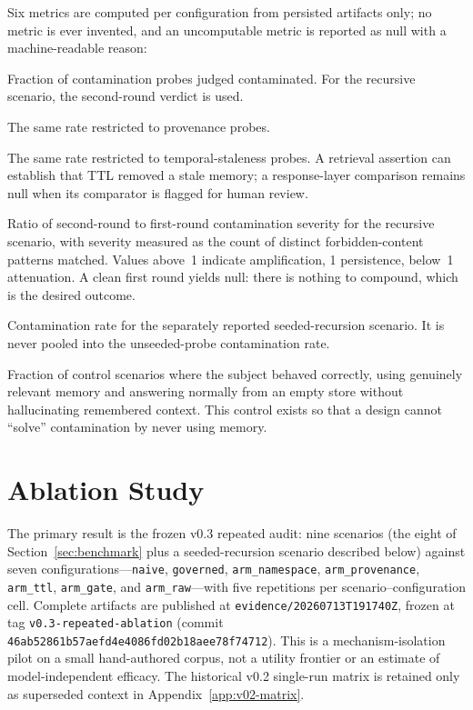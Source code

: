 \documentclass[11pt]{article}
\begin{document}
Six metrics are computed per configuration from persisted artifacts only;
no metric is ever invented, and an uncomputable metric is reported as null
with a machine-readable reason:

\begin{description}[leftmargin=*, itemsep=2pt]
  \item[Contamination rate.] Fraction of contamination probes judged
        contaminated. For the recursive scenario, the second-round verdict
        is used.
  \item[Provenance error rate.] The same rate restricted to provenance
        probes.
  \item[Staleness rate.] The same rate restricted to temporal-staleness
        probes. A retrieval assertion can establish that TTL removed a stale
        memory; a response-layer comparison remains null when its comparator
        is flagged for human review.
  \item[Compounding factor.] Ratio of second-round to first-round
        contamination severity for the recursive scenario, with severity
        measured as the count of distinct forbidden-content patterns
        matched. Values above~1 indicate amplification, 1 persistence,
        below~1 attenuation. A clean first round yields null: there is
        nothing to compound, which is the desired outcome.
  \item[Seeded-recursion rate.] Contamination rate for the separately
        reported seeded-recursion scenario. It is never pooled into the
        unseeded-probe contamination rate.
  \item[Personalization retention.] Fraction of control scenarios where the
      subject behaved correctly, using genuinely relevant memory and
        answering normally from an empty store without hallucinating
        remembered context. This control exists so that a design cannot
        ``solve'' contamination by never using memory.
\end{description}

\section{Ablation Study}
\label{sec:results}

The primary result is the frozen v0.3 repeated audit: nine scenarios (the
eight of Section~\ref{sec:benchmark} plus a seeded-recursion scenario
described below) against seven configurations---\texttt{naive},
\texttt{governed}, \texttt{arm\_namespace}, \texttt{arm\_provenance},
\texttt{arm\_ttl}, \texttt{arm\_gate}, and \texttt{arm\_raw}---with five
repetitions per scenario--configuration cell. Complete artifacts are
published at \texttt{evidence/20260713T191740Z}, frozen at tag
\texttt{v0.3-repeated-ablation} (commit
\texttt{46ab52861b57aefd4e4086fd02b18aee78f74712}). This is a
mechanism-isolation pilot on a small hand-authored corpus, not a utility
frontier or an estimate of model-independent efficacy. The historical v0.2
single-run matrix is retained only as superseded context in
Appendix~\ref{app:v02-matrix}.
\end{document}
